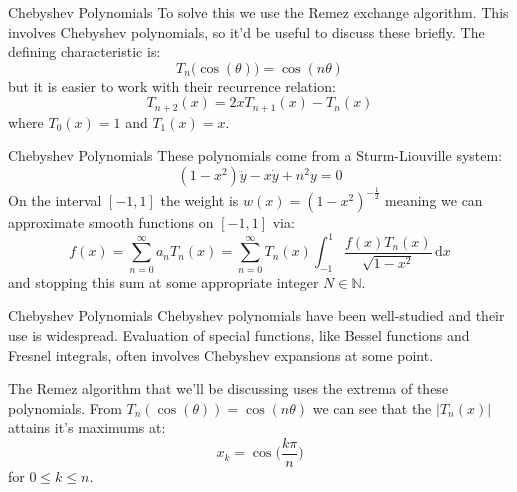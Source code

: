 \documentclass{beamer}
\begin{document}
    \begin{frame}{Chebyshev Polynomials}
        To solve this we use the Remez exchange algorithm. This involves
        Chebyshev polynomials, so it'd be useful to discuss these briefly.
        The defining characteristic is:
        \begin{equation}
            T_{n}\big(\cos(\theta)\big)=\cos(n\theta)
        \end{equation}
        but it is easier to work with their recurrence relation:
        \begin{equation}
            T_{n+2}(x)=2xT_{n+1}(x)-T_{n}(x)
        \end{equation}
        where $T_{0}(x)=1$ and $T_{1}(x)=x$.
    \end{frame}
    \begin{frame}{Chebyshev Polynomials}
        These polynomials come from a Sturm-Liouville system:
        \begin{equation}
            (1-x^{2})\ddot{y}-x\dot{y}+n^{2}y=0
        \end{equation}
        On the interval $[-1,1]$ the weight is
        $w(x)=(1-x^{2})^{-\frac{1}{2}}$ meaning we can approximate smooth
        functions on $[-1,1]$ via:
        \begin{equation}
            f(x)
            =\sum_{n=0}^{\infty}a_{n}T_{n}(x)
            =\sum_{n=0}^{\infty}T_{n}(x)\int_{-1}^{1}
                \frac{f(x)T_{n}(x)}{\sqrt{1-x^2}}\,\textrm{d}x
        \end{equation}
        and stopping this sum at some appropriate integer $N\in\mathbb{N}$.
    \end{frame}
    \begin{frame}{Chebyshev Polynomials}
        Chebyshev polynomials have been well-studied and their use is
        widespread. Evaluation of special functions, like Bessel functions and
        Fresnel integrals, often involves Chebyshev expansions at some point.
        \par\hfill\par
        The Remez algorithm that we'll be discussing uses the extrema of these
        polynomials. From $T_{n}(\cos(\theta))=\cos(n\theta)$ we can see that
        the $|T_{n}(x)|$ attains it's maximums at:
        \begin{equation}
            x_{k}=\cos\Big(\frac{k\pi}{n}\Big)
        \end{equation}
        for $0\leq{k}\leq{n}$.
    \end{frame}
\end{document}
